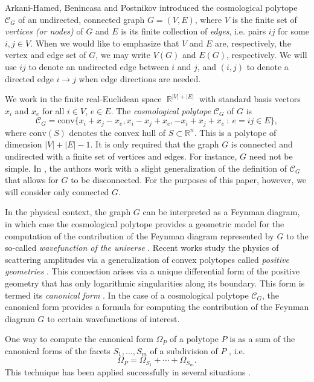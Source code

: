 \documentclass[11pt]{article}
\theoremstyle{definition}
\numberwithin{equation}{section}
\DeclareMathOperator{\RR}{\mathbb{R}}
\begin{document}
Arkani-Hamed, Benincasa and Postnikov \cite{arkani2017cosmological} introduced the cosmological polytope $\mathcal{C}_G$ of an undirected, connected graph $G = (V,E)$, where $V$ is the finite set of \emph{vertices (or nodes)} of $G$ and $E$ is its finite collection of \emph{edges}, i.e. pairs $ij$ for some $i,j\in V$.
When we would like to emphasize that $V$ and $E$ are, respectively, the vertex and edge set of $G$, we may write $V(G)$ and $E(G)$, respectively. 
We will use $ij$ to denote an undirected edge between $i$ and $j$, and $(i,j)$ to denote a directed edge $i\rightarrow j$ when edge directions are needed.

We work in the finite real-Euclidean space $\RR^{|V|+|E|}$ with standard basis vectors $x_i$ and $x_e$ for all $i\in V$, $e\in E$. 
The \emph{cosmological polytope} $\mathcal{C}_G$ of $G$ is 
\[
        \mathcal{C}_G=\text{conv}\{x_i+x_j-x_e,x_i-x_j+x_e,-x_i+x_j+x_e ~:~ e = ij\in E\},
\]
where $\text{conv}(S)$ denotes the convex hull of $S\subset \mathbb{R}^n$.  
This is a polytope of dimension $|V| + |E| - 1$. 
It is only required that the graph $G$ is connected and undirected with a finite set of vertices and edges. 
For instance, $G$ need not be simple. 
In \cite{kuhne2022faces}, the authors work with a slight generalization of the definition of $\mathcal{C}_G$ that allows for $G$ to be disconnected. 
For the purposes of this paper, however, we will consider only connected $G$. 
 

In the physical context, the graph $G$ can be interpreted as a Feynman diagram, in which case the cosmological polytope provides a geometric model for the computation of the contribution of the Feynman diagram represented by $G$ to the so-called \emph{wavefunction of the universe} \cite{arkani2017cosmological}. 
Recent works study the physics of scattering amplitudes via a generalization of convex polytopes called \emph{positive geometries} \cite{arkani2017positive}. 
This connection arises via a unique differential form of the positive geometry that has only logarithmic singularities along its boundary. 
This form is termed its \emph{canonical form} \cite{arkani2017positive}.
In the case of a cosmological polytope $\mathcal{C}_G$, the canonical form provides a formula for computing the contribution of the Feynman diagram $G$ to certain wavefunctions of interest. 

One way to compute the canonical form $\Omega_P$ of a polytope $P$ is as a sum of the canonical forms of the facets $S_1,\ldots, S_m$ of a subdivision of $P$ \cite{lam2022invitation}, i.e.
\begin{equation}
    \label{eqn: canonical form}
    \Omega_P = \Omega_{S_1} + \cdots + \Omega_{S_m}. 
\end{equation}
This technique has been applied successfully in several situations \cite{benincasa2022physical,galashin2020parity,herrmann2021positive,kojima2020sign,mohammadi2021triangulations}.  
\end{document}

